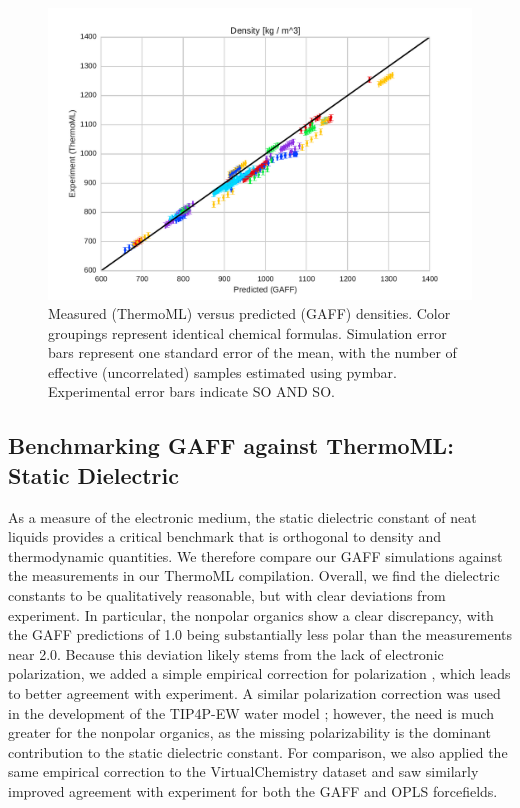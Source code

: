 \documentclass[journal=jacsat,manuscript=article]{achemso}
\begin{document}
\begin{figure}
\includegraphics[width=\columnwidth]{./figures/densities_thermoml.pdf}
\caption{Measured (ThermoML) versus predicted (GAFF) densities.  Color groupings represent identical chemical formulas.  Simulation error bars represent one standard error of the mean, with the number of effective (uncorrelated) samples estimated using pymbar.  Experimental error bars indicate SO AND SO.
}
\end{figure}


\subsection{Benchmarking GAFF against ThermoML: Static Dielectric}

As a measure of the electronic medium, the static dielectric constant of neat liquids provides a critical benchmark that is orthogonal to density and thermodynamic quantities.  We therefore compare our GAFF simulations against the measurements in our ThermoML compilation.  Overall, we find the dielectric constants to be qualitatively reasonable, but with clear deviations from experiment.  In particular, the nonpolar organics show a clear discrepancy, with the GAFF predictions of 1.0 being substantially less polar than the measurements near 2.0.  Because this deviation likely stems from the lack of electronic polarization, we added a simple empirical correction for polarization \cite{bosque2002polarizabilities}, which leads to better agreement with experiment.  A similar polarization correction was used in the development of the TIP4P-EW water model \cite{horn2004}; however, the need is much greater for the nonpolar organics, as the missing polarizability is the dominant contribution to the static dielectric constant.  For comparison, we also applied the same empirical correction to the VirtualChemistry dataset \cite{caleman2011force, van2012gromacs} and saw similarly improved agreement with experiment for both the GAFF and OPLS forcefields.
\end{document}

